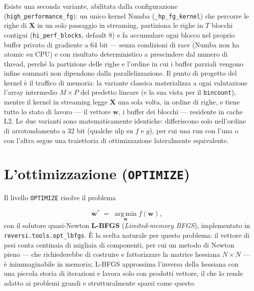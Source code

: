 Esiste una seconda variante, abilitata dalla configurazione
(\texttt{high\_performance\_fg}): un unico kernel Numba
(\texttt{\_hp\_fg\_kernel}) che percorre le righe di $\bm{X}$ in un solo
passaggio in streaming, partiziona le righe in $T$ blocchi contigui
(\texttt{hi\_perf\_blocks}, default $8$) e fa accumulare ogni blocco nel
proprio buffer privato di gradiente a 64 bit — senza condizioni di race
(Numba non ha atomic su CPU) e con risultato deterministico a prescindere dal
numero di thread, perché la partizione delle righe e l'ordine in cui i buffer
parziali vengono infine sommati non dipendono dalla parallelizzazione. Il
punto di progetto del kernel è il traffico di memoria: la variante classica
materializza a ogni valutazione l'array intermedio $M \times P$ del predetto
lineare (e la sua vista per il \texttt{bincount}), mentre il kernel in
streaming legge $\bm{X}$ una sola volta, in ordine di righe, e tiene tutto
lo stato di lavoro — il vettore $\bm{w}$, i buffer dei blocchi — residente
in cache L2. Le due varianti sono matematicamente identiche: differiscono
solo nell'ordine di arrotondamento a 32 bit (qualche ulp su $f$ e $g$), per
cui una run con l'una o con l'altra segue una traiettoria di ottimizzazione
lateralmente equivalente.

\section{L'ottimizzazione (\texttt{OPTIMIZE})}

Il livello \texttt{OPTIMIZE} risolve il problema

\begin{equation}
  \bm{w}^{*} \;=\; \operatorname*{arg\,min}_{\bm{w}} f(\bm{w}) ,
  \label{eq:optimize}
\end{equation}
con il solutore quasi-Newton \textbf{L-BFGS} (\emph{Limited-memory BFGS}),
implementato in \texttt{reversi.tools.opt\_lbfgs}. È la scelta naturale per
questo problema: il vettore di pesi conta centinaia di migliaia di
componenti, per cui un metodo di Newton pieno — che richiederebbe di
costruire e fattorizzare la matrice hessiana $N \times N$ — è inimmaginabile
in memoria; L-BFGS approssima l'inversa della hessiana con una piccola
storia di iterazioni e lavora solo con prodotti vettore, il che lo rende
adatto ai problemi grandi e strutturalmente sparsi come questo.

